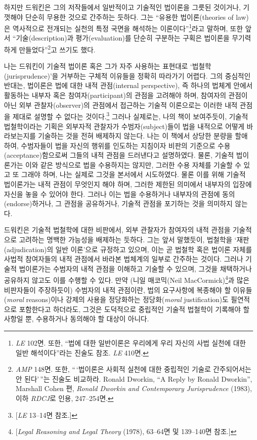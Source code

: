 하지만 드워킨은 그의 저작들에서 일반적이고 기술적인 법이론을 그릇된
것이거나, 기껏해야 단순히 무용한 것으로 간주하는 듯하다. 그는 ``유용한
법이론(theories of law)은 역사적으로 전개되는 실천의 특정 국면을
해석하는 이론이다''\footnote{\emph{LE} 102면. 또한, ``법에 대한
  일반이론은 우리에게 우리 자신의 사법 실천에 대한 일반 해석이다''라는
  진술도 참조. \emph{LE} 410면.}라고 말하며, 또한 앞서
``기술(description)과 평가(evaluation)를 단순히 구분하는 구획은 법이론을
무기력하게 만들었다''\footnote{\emph{AMP} 148면. 또한, ``\,`법이론은
  사회적 실천에 대한 중립적인 기술로 간주되어서는 안 된다'\,''는 진술도
  비교하라. Ronald Dworkin, ``A Reply by Ronald Dworkin'', Marshall
  Cohen 편, \emph{Ronald Dworkin and Contemporary Jurisprudence} (1983),
  이하 \emph{RDCJ}로 인용, 247--254면.}고 쓰기도 했다.

나는 드워킨이 기술적 법이론 혹은 그가 자주 사용하는 표현대로
`법철학(jurisprudence)'을 거부하는 구체적 이유들을 정확히 따라가기
어렵다. 그의 중심적인 반대는, 법이론은 법에 대한 내적 관점(internal
perspective), 즉 하나의 법체계 안에서 활동하는 내부자 혹은
참여자(participant)의 관점을 고려해야 하며, 참여자의 관점이 아닌 외부
관찰자(observer)의 관점에서 접근하는 기술적 이론으로는 이러한 내적
관점을 제대로 설명할 수 없다는 것이다.\footnote{{[}\emph{LE} 13--14면
  참조.{]}} 그러나 실제로는, 나의 책이 보여주듯이, 기술적 법철학이라는
기획은 외부자적 관찰자가 수범자(subject)들이 법을 내적으로 어떻게
바라보는지를 기술하는 것을 전혀 배제하지 않는다. 나는 이 책에서 상당한
분량을 할애하여, 수범자들이 법을 자신의 행위를 인도하는 지침이자 비판의
기준으로 수용(acceptance)함으로써 그들의 내적 관점을 드러낸다고
설명하였다. 물론, 기술적 법이론가는 이와 같은 방식으로 법을 수용하지는
않지만, 그러한 수용 자체를 기술할 수 있고 또 그래야 하며, 나는 실제로
그것을 본서에서 시도하였다. 물론 이를 위해 기술적 법이론가는 내적 관점이
무엇인지 해야 하며, 그러한 제한된 의미에서
내부자의 입장에 자신을 놓을 수 있어야 한다. 그러나 이는 법을 수용하거나
내부자의 관점에 동의(endorse)하거나, 그 관점을 공유하거나, 기술적 관점을
포기하는 것을 의미하지 않는다.

드워킨은 기술적 법철학에 대한 비판에서, 외부 관찰자가 참여자의 내적
관점을 기술적으로 고려하는 명백한 가능성을 배제하는 듯하다. 그는 앞서
말했듯이, 법철학을 `재판(adjudication)의 일반 이론'으로 규정하고 있으며,
이는 곧 법철학 혹은 법이론 자체를 사법적 참여자들의 내적 관점에서 바라본
법체계의 일부로 간주하는 것이다. 그러나 기술적 법이론가는 수범자의 내적
관점을 이해하고 기술할 수 있으며, 그것을 채택하거나 공유하지 않고도 이를
수행할 수 있다. 만약 (니일 매코믹(Neil MacCormick)\footnote{{[}\emph{Legal
  Reasoning and Legal Theory} (1978), 63--64면 및 139--140면 참조.{]}}과
많은 비판자들이 주장하듯이) 수범자의 내적 관점이란, 법의 요구사항에
복종해야 할  이유들(\emph{moral} reasons)이나 강제의 사용을
정당화하는  정당화(\emph{moral} justification)도 필연적으로
포함한다고 하더라도, 그것은 도덕적으로 중립적인 기술적 법철학이 기록해야
할 사항일 뿐, 수용하거나 동의해야 할 대상이 아니다.

